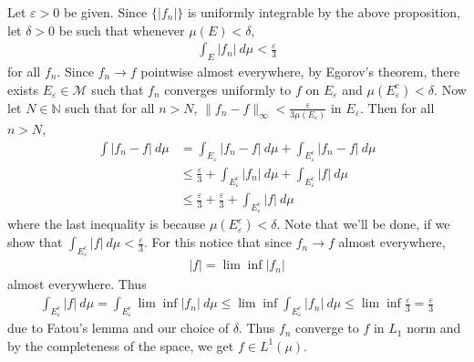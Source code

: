 \documentclass[12pt]{exam}
\theoremstyle{plain} %
\theoremstyle{definition} %
\theoremstyle{remark} %
\begin{document}
\begin{questions}
\begin{solution}
    Let $\varepsilon > 0$ be given. Since $\{ |f_n| \}$ is uniformly
    integrable by the above proposition, let $\delta > 0$ be such that
    whenever $\mu(E) < \delta$,
    \begin{align*}
      \int_E |f_n| \ d \mu  < \frac{\varepsilon}{3}
    \end{align*}
    for all $f_n$.
    Since $f_n \to f$ pointwise
    almost everywhere, by Egorov's theorem, there exists
    $E_\varepsilon \in \mathcal{M}$ such that $f_n$ converges
    uniformly to $f$ on
    $E_\varepsilon$ and $ \mu(E_\varepsilon^c)< \delta$. Now let $N
    \in \mathbb{N}$ such that for all $n > N$, $\|f_n - f\|_\infty <
    \frac{\varepsilon}{3 \mu(E_\varepsilon)}$ in $E_\varepsilon$.
    Then for all $n > N$,
    \begin{align*}
      \int |f_n - f| \ d \mu &= \int_{E_\varepsilon} |f_n - f| \ d
      \mu + \int_{E^c_\varepsilon}
      |f_n - f| \ d \mu \\
      &\le \frac{\varepsilon}{3} + \int_{E_\varepsilon^c} |f_n| \ d
      \mu + \int_{E_\varepsilon^c} |f| \ d \mu \\
      &\le \frac{\varepsilon}{3} + \frac{\varepsilon}{3} +
      \int_{E_\varepsilon^c} |f| \ d \mu
    \end{align*}
    where the last inequality is because $\mu(E_\varepsilon^c) <
    \delta$. Note that we'll be done, if we show that
    $\int_{E_\varepsilon^c} |f| \ d \mu < \frac{\varepsilon}{3}$. For
    this notice that since $f_n \to f$ almost everywhere,
    \begin{align*}
      |f| = \lim \inf |f_n|
    \end{align*}
    almost everywhere.
    Thus
    \begin{align*}
      \int_{E_\varepsilon^c} |f| \ d \mu = \int_{E^c_\varepsilon}
      \lim \inf |f_n| \ d \mu \le \lim \inf \int_{E_\varepsilon^c}
      |f_n| \ d \mu \le \lim \inf \frac{\varepsilon}{3} = \frac{\varepsilon}{3}
    \end{align*}
    due to Fatou's lemma and our choice of $\delta$. Thus $f_n$
    converge to $ f$ in $L_1$ norm and by the completeness of the
    space, we get $ f \in L^{1}(\mu)$.
  \end{solution}

\end{questions}
\printbibliography[heading=bibintoc]
\end{document}
